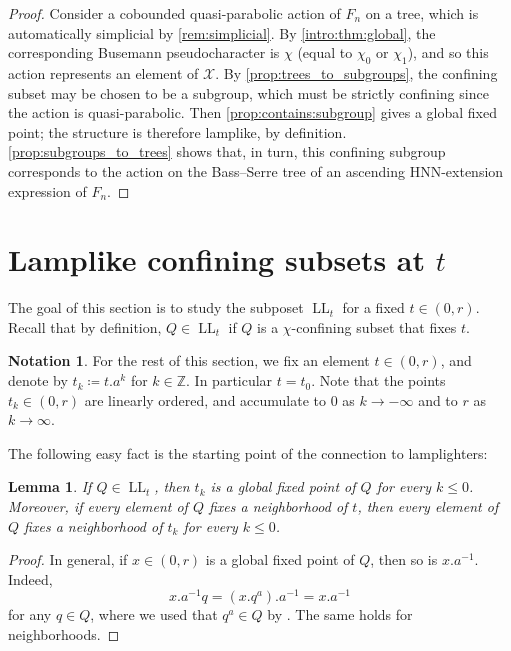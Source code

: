 \documentclass[reqno,12pt]{amsart}\setcounter{tocdepth}{1}
\newtheorem{lemma}[theorem]{Lemma}
\theoremstyle{definition}
\newtheorem{notation}[theorem]{Notation}
\newcommand{\Z}{\mathbb{Z}}
\DeclareMathOperator{\LL}{LL}
\newcommand{\X}{\mathcal{X}}
\numberwithin{equation}{section}
\begin{document}
\begin{proof}
    Consider a cobounded quasi-parabolic action of $F_n$ on a tree, which is automatically simplicial by \cref{rem:simplicial}. By \cref{intro:thm:global}, the corresponding Busemann pseudocharacter is $\chi$ (equal to $\chi_0$ or $\chi_1$), and so this action represents an element of $\X$. By \cref{prop:trees_to_subgroups}, the confining subset may be chosen to be a subgroup, which must be strictly confining since the action is quasi-parabolic. Then \cref{prop:contains:subgroup} gives a global fixed point; the structure is therefore lamplike, by definition. \cref{prop:subgroups_to_trees} shows that, in turn, this confining subgroup corresponds to the action on the Bass--Serre tree of an ascending HNN-extension expression of $F_n$.
\end{proof}



\section{Lamplike confining subsets at $t$}\label{sec:lamplike}

The goal of this section is to study the subposet $\LL_t$ for a fixed $t \in (0, r)$. Recall that by definition, $Q \in \LL_t$ if $Q$ is a $\chi$-confining subset that fixes $t$.

\begin{notation}
For the rest of this section, we fix an element $t \in (0, r)$, and denote by $t_k \coloneqq t.a^k$ for $k\in\Z$. In particular $t = t_0$. Note that the points $t_k \in (0, r)$ are linearly ordered, and accumulate to $0$ as $k \to -\infty$ and to $r$ as $k \to \infty$.
\end{notation}

The following easy fact is the starting point of the connection to lamplighters:

\begin{lemma}
\label{lem:LLt:orbit}
If $Q \in \LL_t$, then $t_k$ is a global fixed point of $Q$ for every $k \leq 0$. Moreover, if every element of $Q$ fixes a neighborhood of $t$, then every element of $Q$ fixes a neighborhood of $t_k$ for every $k \leq 0$.
\end{lemma}

\begin{proof}
In general, if $x \in (0, r)$ is a global fixed point of $Q$, then so is $x.a^{-1}$. Indeed,
\[x.a^{-1}q = (x.q^a).a^{-1} = x.a^{-1}\]
for any $q\in Q$, where we used that $q^a \in Q$ by \StayInConf. The same holds for neighborhoods.
\end{proof}
\end{document}
